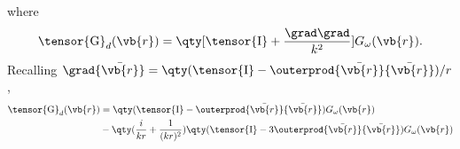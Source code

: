 where
\begin{equation}
  \tensor{\mathrm{G}}_d(\vb{r}) = \qty[\tensor{\mathrm{I}} + \frac{\grad \grad}{k^2}]G_\omega(\vb{r}).
\end{equation}
Recalling $\grad{\bar{\vb{r}}} = \qty(\tensor{\mathrm{I}} - \outerprod{\bar{\vb{r}}}{\bar{\vb{r}}})/r$,
\begin{equation}
  \begin{aligned}
    \tensor{\mathrm{G}}_d(\vb{r}) &= \qty(\tensor{\mathrm{I}} - \outerprod{\bar{\vb{r}}}{\bar{\vb{r}}}) G_\omega(\vb{r}) \\
                                  &- \qty(\frac{i}{k r} + \frac{1}{(k r)^2} ) \qty(\tensor{\mathrm{I}} - 3 \outerprod{\bar{\vb{r}}}{\bar{\vb{r}}}) G_\omega(\vb{r})
  \end{aligned}
\end{equation}
